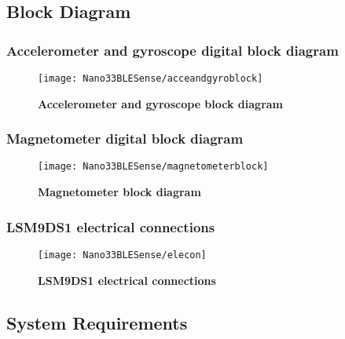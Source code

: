 \subsection{Block Diagram}

\subsubsection{Accelerometer and gyroscope digital block diagram}
\begin{figure}[h!]
    \centering	\texttt{[image: Nano33BLESense/acceandgyroblock]}
    \caption{\textbf{Accelerometer and gyroscope block diagram}} \cite{STMicroelectronics:2015}
\end{figure}

\newpage
\subsubsection{Magnetometer digital block diagram}
\begin{figure}[h!]
    \centering	\texttt{[image: Nano33BLESense/magnetometerblock]}
    \caption{\textbf{Magnetometer block diagram}} \cite{STMicroelectronics:2015}
\end{figure}

\newpage
\subsubsection{LSM9DS1 electrical connections}

\begin{figure}[h!]
    \centering	\texttt{[image: Nano33BLESense/elecon]}
    \caption{\textbf{LSM9DS1 electrical connections}} \cite{STMicroelectronics:2015}
\end{figure}


\subsection{System Requirements}

